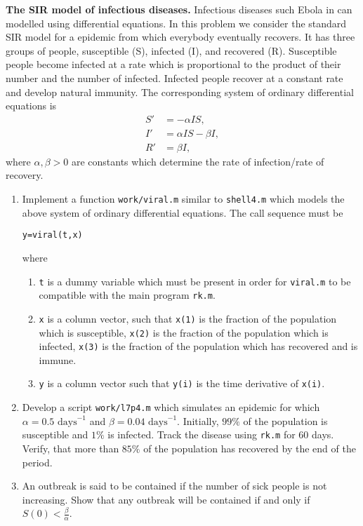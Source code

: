 \documentclass[a4paper,12pt]{article}
\newcounter{problem}
\newenvironment{problem}{\refstepcounter{problem} \noindent {\bf Problem \arabic{problem}}}{\vspace{0.5cm}}
\begin{document}
\begin{problem} {\bf The SIR model of infectious diseases.} Infectious diseases such Ebola in can modelled using differential equations. In this problem we consider the standard SIR model for a epidemic from which everybody eventually recovers. It has three groups of people, susceptible (S), infected (I), and recovered (R). Susceptible people become infected at a rate which is proportional to the product of their number and the number of infected. Infected people recover at a constant rate and develop natural immunity. The corresponding system of ordinary differential equations is
\begin{align}
S' &= - \alpha I S, \\
I' &=  \alpha I S - \beta I, \\
R' &= \beta I,
\end{align}
where $\alpha, \beta > 0$ are constants which determine the rate of infection/rate of recovery.
\begin{enumerate} 
\item Implement a function {\tt work/viral.m} similar to {\tt shell4.m} which models the above system of ordinary differential equations. The call sequence must be
\begin{verbatim}
y=viral(t,x)
\end{verbatim}
where 
\begin{enumerate}
\item {\tt t} is a dummy variable which must be present in order for {\tt viral.m} to be compatible with the main program {\tt rk.m}.
\item {\tt x} is a column vector, such that {\tt x(1)} is the fraction of the population which is susceptible, {\tt x(2)} is the fraction of the population which is infected, {\tt x(3)} is the fraction of the population which has recovered and is immune.
\item {\tt y} is a column vector such that {\tt y(i)} is the time derivative of {\tt x(i)}.
\end{enumerate}
\item Develop a script {\tt work/l7p4.m} which simulates an epidemic for which $\alpha = 0.5 \text{ days}^{-1}$ and $\beta = 0.04 \text{ days}^{-1}$. Initially, $99 \%$ of the population is susceptible and $1 \%$ is infected. Track the disease using {\tt rk.m} for $60$ days. Verify, that more than $85 \%$ of the population has recovered by the end of the period.
\item An outbreak is said to be contained if the number of sick people is not increasing. Show that any outbreak will be contained if and only if $S(0) < \frac{\beta}{\alpha}$.

\end{enumerate}
\end{problem}
\end{document}
